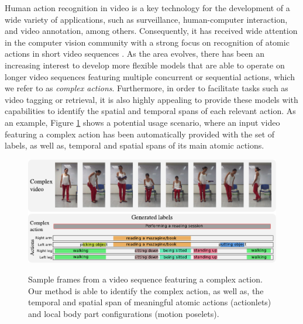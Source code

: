 Human action recognition in video is a key technology for the development of a
wide variety of applications, such as surveillance, human-computer interaction,
and video annotation, among others. Consequently, it has received wide attention
in the computer vision community with a strong focus on recognition of atomic
actions in short video sequences
\cite{Aggarwal2011,Poppe2010,vishwakarma2013survey,weinland2011survey}.
As the area
evolves, there has been an increasing interest to develop more
flexible models that are able to operate on longer video sequences featuring
multiple concurrent or sequential actions, which we refer to as
\textit{complex actions}. Furthermore, in order to facilitate tasks such as
video tagging or retrieval, it is also highly appealing to provide these models
with capabilities to identify the spatial and temporal spans of each relevant
action. As an example, Figure \ref{fig:frontfigure} shows a potential usage
scenario, where an input video featuring a complex action has been automatically
provided with the set of labels, as well as, temporal and
spatial spans of its main atomic actions.

\begin{figure}[t]
\begin{center} \label{fig:frontfigure}
\includegraphics[width=0.98\linewidth]{Fig/portada.pdf}
\vspace{-0.5cm}
\end{center}
\caption{Sample frames from a video sequence featuring a complex action. 
Our method is able to identify the complex action, as well as, the temporal and 
spatial span of meaningful atomic actions (actionlets) and local body part 
configurations (motion poselets).}
\vspace{-0.5cm}
\end{figure}


